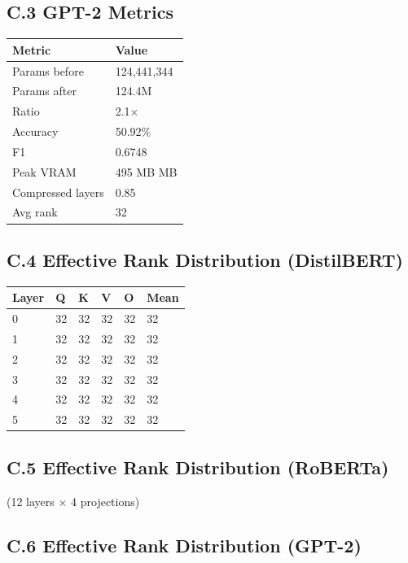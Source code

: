 \subsection{C.3 GPT-2 Metrics}

\begin{table}[H]
\centering
\small
\begin{tabular}{ll}
\toprule
\textbf{Metric} & \textbf{Value} \\
\midrule
Params before & 124,441,344 \\
Params after & 124.4M \\
Ratio & 2.1$\times$ \\
Accuracy & 50.92\% \\
F1 & 0.6748 \\
Peak VRAM & 495 MB MB \\
Compressed layers & 0.85 \\
Avg rank & 32 \\
\bottomrule
\end{tabular}
\end{table}

\subsection{C.4 Effective Rank Distribution (DistilBERT)}

\begin{table}[H]
\centering
\small
\begin{tabular}{llllll}
\toprule
\textbf{Layer} & \textbf{Q} & \textbf{K} & \textbf{V} & \textbf{O} & \textbf{Mean} \\
\midrule
0 & 32 & 32 & 32 & 32 & 32 \\
1 & 32 & 32 & 32 & 32 & 32 \\
2 & 32 & 32 & 32 & 32 & 32 \\
3 & 32 & 32 & 32 & 32 & 32 \\
4 & 32 & 32 & 32 & 32 & 32 \\
5 & 32 & 32 & 32 & 32 & 32 \\
\bottomrule
\end{tabular}
\end{table}

\subsection{C.5 Effective Rank Distribution (RoBERTa)}

(12 layers $\times$ 4 projections)

\subsection{C.6 Effective Rank Distribution (GPT-2)}

